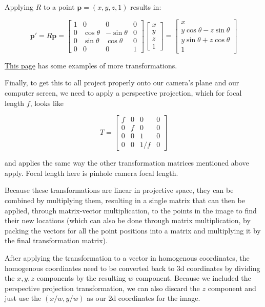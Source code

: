\documentclass{article}
\begin{document}
Applying $R$ to a point $\mathbf{p} = (x, y, z, 1)$ results in:

\[ \mathbf{p'} = R \mathbf{p} = \begin{bmatrix}
1 & 0 & 0 & 0 \\
0 & \cos \theta & -\sin \theta & 0 \\
0 & \sin \theta & \cos \theta & 0 \\
0 & 0 & 0 & 1
\end{bmatrix} \begin{bmatrix}
x \\
y \\
z \\
1
\end{bmatrix} = \begin{bmatrix}
x \\
y \cos \theta - z \sin \theta \\
y \sin \theta + z \cos \theta \\
1
\end{bmatrix} \]

\href{https://www.brainvoyager.com/bv/doc/UsersGuide/CoordsAndTransforms/SpatialTransformationMatrices.html}{This page} has some examples of more transformations.

Finally, to get this to all project properly onto our camera's plane and our computer screen, we need to apply a perspective projection, which for focal length $f$, looks like

\[ T = \begin{bmatrix}
f & 0 & 0 & 0 \\
0 & f & 0 & 0 \\
0 & 0 & 1 & 0 \\
0 & 0 & 1 / f & 0
\end{bmatrix} \]

and applies the same way the other transformation matrices mentioned above apply. Focal length here is pinhole camera focal length.

Because these transformations are linear in projective space, they can be combined by multiplying them, resulting in a single matrix that can then be applied, through matrix-vector multiplication, to the points in the image to find their new locations (which can also be done through matrix multiplication, by packing the \@{vectors} for all the point positions into a matrix and multiplying it by the final transformation matrix).

After applying the transformation to a \@{vector} in homogenous coordinates, the homogenous coordinates need to be converted back to 3d coordinates by dividing the $x, y, z$ \@{components} by
the resulting $w$ component. Because we included the perspective projection transformation, we can also discard the $z$ component and just use the $(x/w, y/w)$ as our 2d coordinates for the image.
\end{document}
